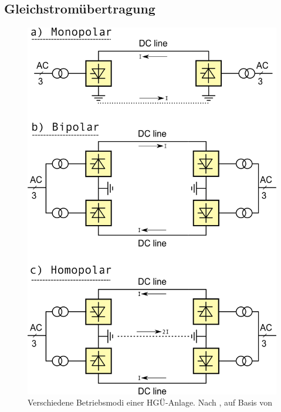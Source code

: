 \subsection{Gleichstromübertragung}

\begin{figure}[tbhn]
\begin{center}
\noindent
\includegraphics[scale=0.2]{Hvdc_ALL_schematic.png}
\end{center}
\caption{Verschiedene Betriebsmodi einer HGÜ-Anlage. Nach \cite{Padiyar}, auf Basis von \cite{schematic}}
\label{pic:HVDCtypen}
\end{figure}

